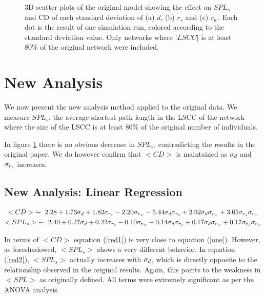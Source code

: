 \begin{figure}[hbt!]\centering
    \par

    \hfill

    \caption{3D scatter plots of the original model
    showing the effect on $SPL_s$ and CD of each
    standard deviation of
    (a) $d$, (b) $r_s$ and (c) $r_w$. Each dot is the result of one simulation run, colored
    according to the standard deviation value. Only networks where $|LSCC|$ is at
    least 80\% of the original network were included.}
    \label{fig:base-reduced}
\end{figure}

\section{New Analysis}\label{sec:newAnalysis}
We now present the new analysis method applied to the original data.
We measure $SPL_s$, the average
shortest path length in the LSCC of the network where the size of
the LSCC is at least 80\% of the original number of individuals.

In figure \ref{fig:base-reduced} there is no obvious decrease in $SPL_s$,
contradicting the results in the original paper.
We do however confirm that $<CD>$ is maintained as $\sd$ and $\ss$ increases.


\subsection{New Analysis: Linear Regression}

\begin{gather}
    <CD> ~ \thicksim ~ 2.28 + 1.73\sd + 1.82\ss - 2.20\sw -
                5.44\ds + 2.92\dw + 3.05\ssw \label{red1}\\
    <SPL_s> ~ \thicksim ~ 2.40 + 0.27\sd + 0.22\ss - 0.10 \sw -
                0.14\ds + 0.17\dw + 0.17\ssw \label{red2}
\end{gather}

In terms of $<CD>$ equation (\ref{red1}) is very close to equation (\ref{one}).
However, as foreshadowed, $<SPL_s>$ shows a very different behavior.
In equation (\ref{red2}), $<SPL_s>$ actually increases with $\sd$, which is
directly opposite to the relationship observed in the original results.
Again, this points to the weakness in $<SPL>$ as originally defined.
All terms were extremely significant as per the ANOVA analysis.